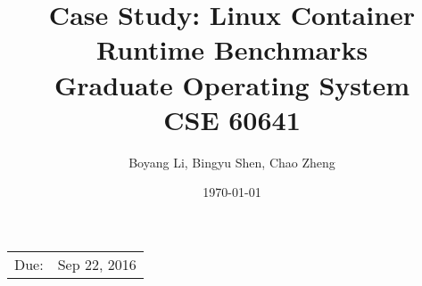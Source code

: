 \documentclass{article}
\title{Case Study: Linux Container Runtime Benchmarks \\ Graduate Operating System \\ CSE 60641} %
\date{\today} %
\author{Boyang Li, Bingyu Shen, Chao Zheng}
\begin{document}
\maketitle %

\begin{center}
\begin{tabular}{l r}
Due: & Sep 22, 2016\\ 
\end{tabular}
\end{center}
\nocite{*}





\end{document}
